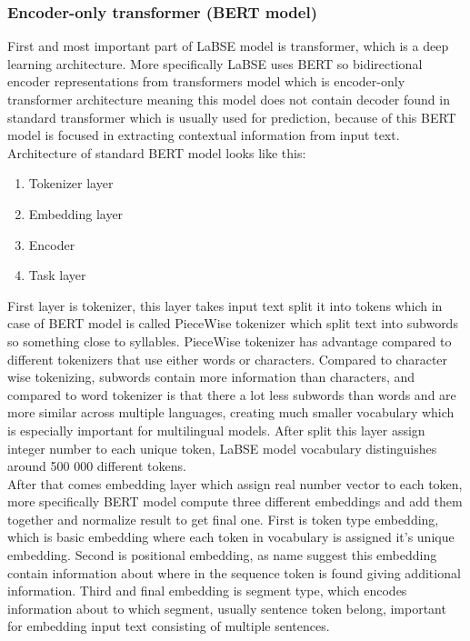 \subsubsection{Encoder-only transformer (BERT model)}
\label{emb:trans}

First and most important part of LaBSE model is transformer, which is a deep learning architecture. More specifically LaBSE uses BERT so bidirectional encoder representations from transformers model which is encoder-only transformer architecture meaning this model does not contain decoder found in standard transformer which is usually used for prediction, because of this BERT model is focused in extracting contextual information from input text. Architecture of standard BERT model looks like this: 
\\

\begin{enumerate}
	\item Tokenizer layer
	\item Embedding layer
	\item Encoder
	\item Task layer
\end{enumerate}

First layer is tokenizer, this layer takes input text split it into tokens which in case of BERT model is called PieceWise tokenizer which split text into subwords so something close to syllables. PieceWise tokenizer has advantage compared to different tokenizers that use either words or characters. Compared to character wise tokenizing, subwords contain more information than characters, and compared to word tokenizer is that there a lot less subwords than words and are more similar across multiple languages, creating much smaller vocabulary which is especially important for multilingual models. After split this layer assign integer number to each unique token, LaBSE model vocabulary distinguishes around 500 000 different tokens.
\\

After that comes embedding layer which assign real number vector to each token, more specifically BERT model compute three different embeddings and add them together and normalize result to get final one. First is token type embedding, which is basic embedding where each token in vocabulary is assigned it's unique embedding. Second is positional embedding, as name suggest this embedding contain information about where in the sequence token is found giving additional information. Third and final embedding is segment type, which encodes information about to which segment, usually sentence token belong, important for embedding input text consisting of multiple sentences.
\\

